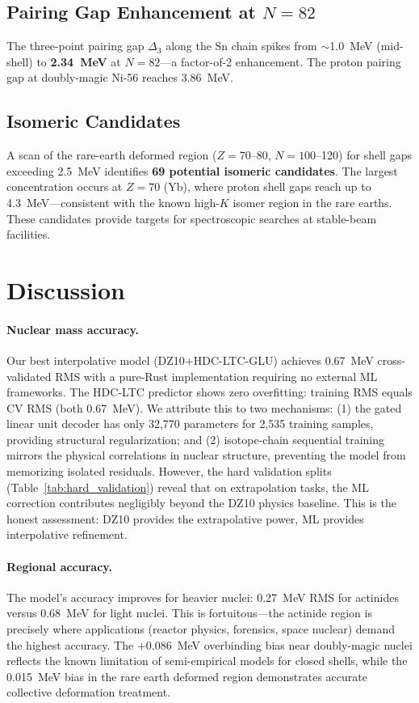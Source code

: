 \documentclass[letterpaper,11pt]{article}
\begin{document}
\subsection{Pairing Gap Enhancement at $N=82$}

The three-point pairing gap $\Delta_3$ along the Sn chain spikes from
$\sim$1.0~MeV (mid-shell) to \textbf{2.34~MeV} at $N = 82$---a factor-of-2
enhancement. The proton pairing gap at doubly-magic Ni-56 reaches 3.86~MeV.

\subsection{Isomeric Candidates}

A scan of the rare-earth deformed region ($Z=70$--80, $N=100$--120) for
shell gaps exceeding 2.5~MeV identifies \textbf{69 potential isomeric
candidates}. The largest concentration occurs at $Z = 70$ (Yb), where
proton shell gaps reach up to 4.3~MeV---consistent with the known
high-$K$ isomer region in the rare earths. These candidates provide
targets for spectroscopic searches at stable-beam facilities.

\section{Discussion}

\paragraph{Nuclear mass accuracy.} Our best interpolative model (DZ10+HDC-LTC-GLU)
achieves 0.67~MeV cross-validated RMS with a pure-Rust implementation requiring
no external ML frameworks. The HDC-LTC predictor shows zero overfitting: training
RMS equals CV RMS (both 0.67~MeV). We attribute this to two mechanisms: (1) the
gated linear unit decoder has only 32,770 parameters for 2,535 training samples,
providing structural regularization; and (2) isotope-chain sequential training
mirrors the physical correlations in nuclear structure, preventing the model from
memorizing isolated residuals. However, the hard validation splits
(Table~\ref{tab:hard_validation}) reveal that on extrapolation tasks, the ML
correction contributes negligibly beyond the DZ10 physics baseline. This is the
honest assessment: DZ10 provides the extrapolative power, ML provides
interpolative refinement.

\paragraph{Regional accuracy.} The model's accuracy improves for heavier nuclei:
0.27~MeV RMS for actinides versus 0.68~MeV for light nuclei. This is
fortuitous---the actinide region is precisely where applications (reactor
physics, forensics, space nuclear) demand the highest accuracy. The $+0.086$~MeV
overbinding bias near doubly-magic nuclei reflects the known limitation of
semi-empirical models for closed shells, while the 0.015~MeV bias in the rare
earth deformed region demonstrates accurate collective deformation treatment.
\end{document}

